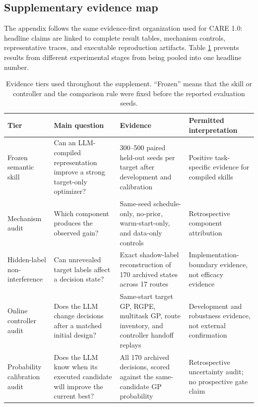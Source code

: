 \documentclass[pdflatex,sn-nature]{sn-jnl}
\begin{document}
\begin{appendices}

\clearpage
\section{Supplementary evidence map}
\label{sec:evidence_map}

The appendix follows the same evidence-first organization used for CARE 1.0:
headline claims are linked to complete result tables, mechanism controls,
representative traces, and executable reproduction artifacts. Table
\ref{tab:evidence_tiers} prevents results from different experimental stages
from being pooled into one headline number.

\begin{table}[t]
\centering
\caption{Evidence tiers used throughout the supplement. ``Frozen'' means that
the skill or controller and the comparison rule were fixed before the reported
evaluation seeds.}
\label{tab:evidence_tiers}
\scriptsize
\setlength{\tabcolsep}{3pt}
\renewcommand{\arraystretch}{0.92}
\begin{tabularx}{\textwidth}{p{2.5cm}p{3.6cm}X p{3.2cm}}
\toprule
Tier & Main question & Evidence & Permitted interpretation \\
\midrule
Frozen semantic skill & Can an LLM-compiled representation improve a strong target-only optimizer? & 300--500 paired held-out seeds per target after development and calibration & Positive task-specific evidence for compiled skills \\
Mechanism audit & Which component produces the observed gain? & Same-seed schedule-only, no-prior, warm-start-only, and data-only controls & Retrospective component attribution \\
Hidden-label non-interference & Can unrevealed target labels affect a decision state? & Exact shadow-label reconstruction of 170 archived states across 17 routes & Implementation-boundary evidence, not efficacy evidence \\
Online controller audit & Does the LLM change decisions after a matched initial design? & Same-start target GP, RGPE, multitask GP, route inventory, and controller handoff replays & Development and robustness evidence, not external confirmation \\
Probability calibration audit & Does the LLM know when its executed candidate will improve the current best? & All 170 archived decisions, scored against the same-candidate GP probability & Retrospective uncertainty audit; no prospective gate claim \\
\bottomrule
\end{tabularx}
\end{table}


\end{appendices}
\end{document}
